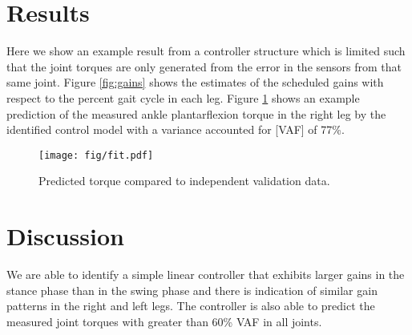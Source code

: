 \documentclass[10pt,letterpaper,notitlepage,twocolumn]{article}
\begin{document}
\section*{Results}
%
Here we show an example result from a controller structure which is limited
such that the joint torques are only generated from the error in the sensors
from that same joint. Figure \ref{fig:gains} shows the estimates of the
scheduled gains with respect to the percent gait cycle in each leg. Figure
\ref{fig:fit} shows an example prediction of the measured ankle plantarflexion
torque in the right leg by the identified control model with a variance
accounted for [VAF] of 77\%.
%
\begin{figure}[b]
  \begin{center}
    \texttt{[image: fig/fit.pdf]}
    \caption{Predicted torque compared to independent validation data.}
    \label{fig:fit}
  \end{center}
\end{figure}
%
\section*{Discussion}
%
We are able to identify a simple linear controller that exhibits larger gains
in the stance phase than in the swing phase and there is indication of similar
gain patterns in the right and left legs. The controller is also able to
predict the measured joint torques with greater than 60\% VAF in all joints.
%
%
\end{document}

